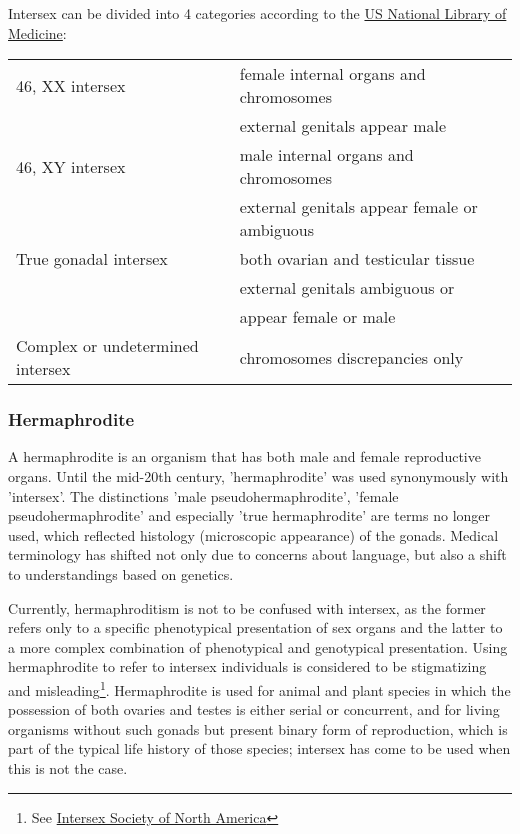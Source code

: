 Intersex can be divided into 4 categories according to the \href{https://medlineplus.gov/ency/article/001669.htm}{US National Library of Medicine}:

\begin{tabular}{ l l }
46, XX intersex & female internal organs and chromosomes \\
& external genitals appear male \\
46, XY intersex & male internal organs and chromosomes \\
& external genitals appear female or ambiguous \\
True gonadal intersex & both ovarian and testicular tissue \\
& external genitals ambiguous or \\
& appear female or male \\
Complex or undetermined intersex & chromosomes discrepancies only \\
\end{tabular}


\subsubsection{Hermaphrodite}
\label{hermaphrodite}
A hermaphrodite is an organism that has both male and female reproductive organs. Until the mid-20th century, 'hermaphrodite' was used synonymously with 'intersex'. The distinctions 'male pseudohermaphrodite', 'female pseudohermaphrodite' and especially 'true hermaphrodite' are terms no longer used, which reflected histology (microscopic appearance) of the gonads. Medical terminology has shifted not only due to concerns about language, but also a shift to understandings based on genetics.

Currently, hermaphroditism is not to be confused with intersex, as the former refers only to a specific phenotypical presentation of sex organs and the latter to a more complex combination of phenotypical and genotypical presentation. Using hermaphrodite to refer to intersex individuals is considered to be stigmatizing and misleading\footnote{See \href{https://web.archive.org/web/20130701061246/http://www.isna.org/faq/hermaphrodite}{Intersex Society of North America}}. Hermaphrodite is used for animal and plant species in which the possession of both ovaries and testes is either serial or concurrent, and for living organisms without such gonads but present binary form of reproduction, which is part of the typical life history of those species; intersex has come to be used when this is not the case.

